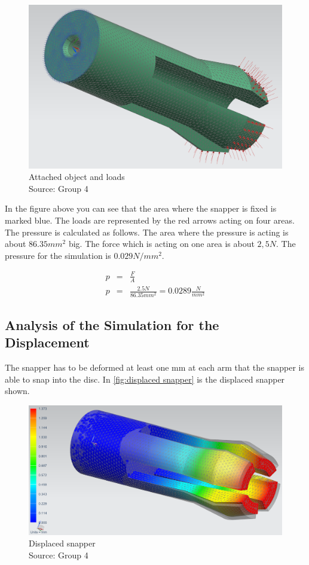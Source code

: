 \documentclass[a4paper,12pt]{scrreprt}
\begin{document}
 \begin{figure}[H]
  \centering
   \includegraphics[width=1\textwidth]{pictures/FEA2}
   \caption[Attached object  and loads]{Attached object  and loads\\
	Source: Group 4  
  }
   \label{fig:attached object  and loads}
\end{figure} 

In the figure above you can see that the area where the snapper is fixed is marked blue. The loads are represented by the red arrows acting on four areas. The pressure is calculated as follows. The area where the pressure is acting is about $86.35mm^{2}$ big. The force which is acting on one area is about $2,5N$. The pressure for the simulation is $0.029 N/mm^{2}$. 

\begin{eqnarray}
p &=& \frac{F}{A}\\
p &=& \frac{2.5N}{86.35 mm^{2}} = 0.0289 \frac{N}{mm^{2}}
\end{eqnarray}

\subsection{Analysis of the Simulation for the Displacement}
The snapper has to be deformed at least one mm at each arm that the snapper is able to snap into the disc. In \autoref{fig:displaced snapper} is the displaced snapper shown. 

 \begin{figure}[H]
  \centering
   \includegraphics[width=1\textwidth]{pictures/FEA4}
   \caption[Displaced snapper]{Displaced snapper\\
	Source: Group 4  
  }
   \label{fig:displaced snapper}
\end{figure}
\end{document}
